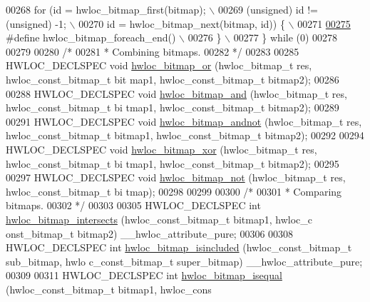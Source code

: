 \begin{DoxyCode}
00268 \textcolor{preprocessor}{        for (id = hwloc\_bitmap\_first(bitmap); \(\backslash\)}
00269 \textcolor{preprocessor}{             (unsigned) id != (unsigned) -1; \(\backslash\)}
00270 \textcolor{preprocessor}{             id = hwloc\_bitmap\_next(bitmap, id)) \{ \(\backslash\)}
00271 \textcolor{preprocessor}{}
\hypertarget{a00027_source_l00275}{}\hyperlink{a00065_gafcf3246db406218d4e155735b3fa6528}{00275} \textcolor{preprocessor}{#define hwloc\_bitmap\_foreach\_end() \(\backslash\)}
00276 \textcolor{preprocessor}{        \} \(\backslash\)}
00277 \textcolor{preprocessor}{\} while (0)}
00278 \textcolor{preprocessor}{}
00279 
00280 \textcolor{comment}{/*}
00281 \textcolor{comment}{ * Combining bitmaps.}
00282 \textcolor{comment}{ */}
00283 
00285 HWLOC\_DECLSPEC \textcolor{keywordtype}{void} \hyperlink{a00065_ga1ba1de709ee9a7cf5cc8ad2d9a1a81d4}{hwloc_bitmap_or} (hwloc\_bitmap\_t res, hwloc\_const\_bitmap\_t bit
      map1, hwloc\_const\_bitmap\_t bitmap2);
00286 
00288 HWLOC\_DECLSPEC \textcolor{keywordtype}{void} \hyperlink{a00065_gac2f7675dcf1b664a832413d9990d1bcf}{hwloc_bitmap_and} (hwloc\_bitmap\_t res, hwloc\_const\_bitmap\_t bi
      tmap1, hwloc\_const\_bitmap\_t bitmap2);
00289 
00291 HWLOC\_DECLSPEC \textcolor{keywordtype}{void} \hyperlink{a00065_ga7618a962685d95564564ba07e9b2199b}{hwloc_bitmap_andnot} (hwloc\_bitmap\_t res, hwloc\_const\_bitmap\_t
       bitmap1, hwloc\_const\_bitmap\_t bitmap2);
00292 
00294 HWLOC\_DECLSPEC \textcolor{keywordtype}{void} \hyperlink{a00065_ga5743af61c30758df75aec29c12444616}{hwloc_bitmap_xor} (hwloc\_bitmap\_t res, hwloc\_const\_bitmap\_t bi
      tmap1, hwloc\_const\_bitmap\_t bitmap2);
00295 
00297 HWLOC\_DECLSPEC \textcolor{keywordtype}{void} \hyperlink{a00065_ga4a8088d62755a083ffce9d592c9e3878}{hwloc_bitmap_not} (hwloc\_bitmap\_t res, hwloc\_const\_bitmap\_t bi
      tmap);
00298 
00299 
00300 \textcolor{comment}{/*}
00301 \textcolor{comment}{ * Comparing bitmaps.}
00302 \textcolor{comment}{ */}
00303 
00305 HWLOC\_DECLSPEC \textcolor{keywordtype}{int} \hyperlink{a00065_ga575c27953709a8cb9a047aae65157526}{hwloc_bitmap_intersects} (hwloc\_const\_bitmap\_t bitmap1, hwloc\_c
      onst\_bitmap\_t bitmap2) \_\_hwloc\_attribute\_pure;
00306 
00308 HWLOC\_DECLSPEC \textcolor{keywordtype}{int} \hyperlink{a00065_gaae29e14a926c198e8f91e6e4790621e7}{hwloc_bitmap_isincluded} (hwloc\_const\_bitmap\_t sub\_bitmap, hwlo
      c\_const\_bitmap\_t super\_bitmap) \_\_hwloc\_attribute\_pure;
00309 
00311 HWLOC\_DECLSPEC \textcolor{keywordtype}{int} \hyperlink{a00065_ga4dd6a75ab63d33ef33bd626b0e489388}{hwloc_bitmap_isequal} (hwloc\_const\_bitmap\_t bitmap1, hwloc\_cons

\end{DoxyCode}
